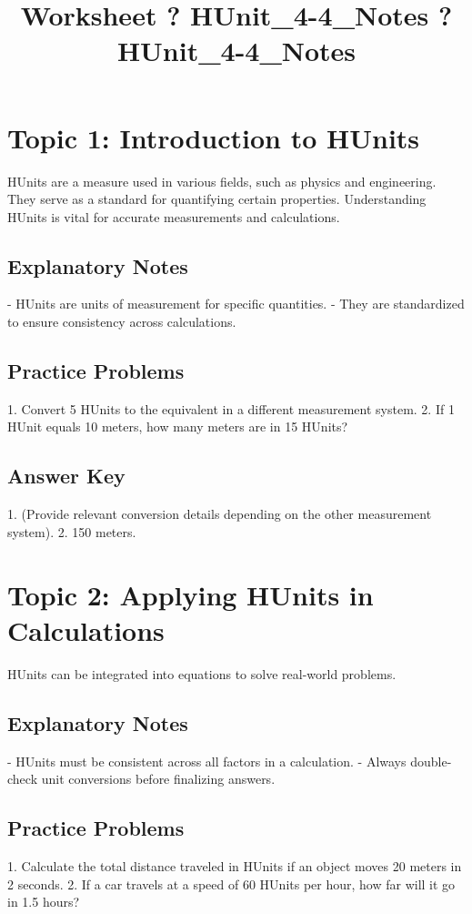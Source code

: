 \documentclass{article}
\title{Worksheet ? HUnit\_4-4\_Notes ? HUnit\_4-4\_Notes}
\author{}
\date{}
\begin{document}
\maketitle

\section*{Topic 1: Introduction to HUnits}
HUnits are a measure used in various fields, such as physics and engineering. They serve as a standard for quantifying certain properties. Understanding HUnits is vital for accurate measurements and calculations.

\subsection*{Explanatory Notes}
- HUnits are units of measurement for specific quantities.
- They are standardized to ensure consistency across calculations.
  
\subsection*{Practice Problems}
1. Convert 5 HUnits to the equivalent in a different measurement system.
2. If 1 HUnit equals 10 meters, how many meters are in 15 HUnits?

\subsection*{Answer Key}
1. (Provide relevant conversion details depending on the other measurement system).
2. 150 meters.

\section*{Topic 2: Applying HUnits in Calculations}
HUnits can be integrated into equations to solve real-world problems.

\subsection*{Explanatory Notes}
- HUnits must be consistent across all factors in a calculation.
- Always double-check unit conversions before finalizing answers.

\subsection*{Practice Problems}
1. Calculate the total distance traveled in HUnits if an object moves 20 meters in 2 seconds.
2. If a car travels at a speed of 60 HUnits per hour, how far will it go in 1.5 hours?
\end{document}
